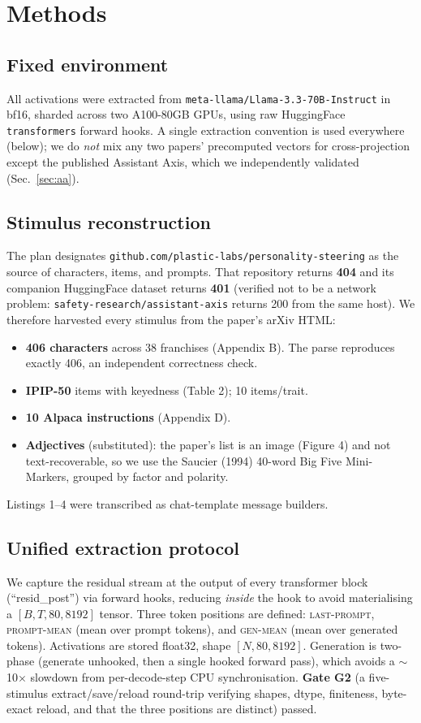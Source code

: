 \documentclass[11pt]{article}
\begin{document}
\section{Methods}

\subsection{Fixed environment}
All activations were extracted from \texttt{meta-llama/Llama-3.3-70B-Instruct} in
bf16, sharded across two A100-80GB GPUs, using raw HuggingFace \texttt{transformers}
forward hooks. A single extraction convention is used everywhere (below); we do
\emph{not} mix any two papers' precomputed vectors for cross-projection except the
published Assistant Axis, which we independently validated (Sec.~\ref{sec:aa}).

\subsection{Stimulus reconstruction}
The plan designates \texttt{github.com/plastic-labs/personality-steering} as the
source of characters, items, and prompts. That repository returns \textbf{404}
and its companion HuggingFace dataset returns \textbf{401} (verified not to be a
network problem: \texttt{safety-research/assistant-axis} returns 200 from the same
host). We therefore harvested every stimulus from the paper's arXiv HTML:
\begin{itemize}
  \item \textbf{406 characters} across 38 franchises (Appendix B). The parse
        reproduces exactly 406, an independent correctness check.
  \item \textbf{IPIP-50} items with keyedness (Table 2); 10 items/trait.
  \item \textbf{10 Alpaca instructions} (Appendix D).
  \item \textbf{Adjectives} (substituted): the paper's list is an image (Figure 4)
        and not text-recoverable, so we use the Saucier (1994) 40-word Big Five
        Mini-Markers, grouped by factor and polarity.
\end{itemize}
Listings 1--4 were transcribed as chat-template message builders.

\subsection{Unified extraction protocol}
We capture the residual stream at the output of every transformer block
(``resid\_post'') via forward hooks, reducing \emph{inside} the hook to avoid
materialising a $[B,T,80,8192]$ tensor. Three token positions are defined:
\textsc{last-prompt}, \textsc{prompt-mean} (mean over prompt tokens), and
\textsc{gen-mean} (mean over generated tokens). Activations are stored float32,
shape $[N,80,8192]$. Generation is two-phase (generate unhooked, then a single
hooked forward pass), which avoids a $\sim$10$\times$ slowdown from per-decode-step
CPU synchronisation. \textbf{Gate G2} (a five-stimulus extract/save/reload
round-trip verifying shapes, dtype, finiteness, byte-exact reload, and that the
three positions are distinct) passed.
\end{document}

